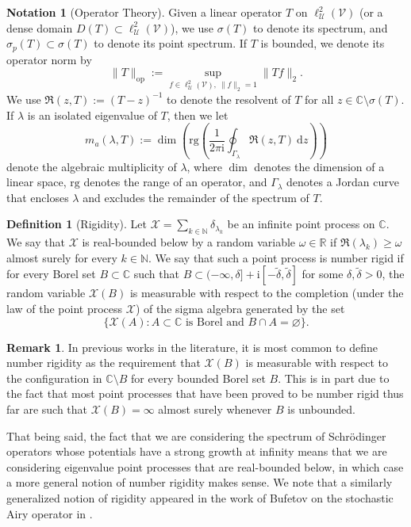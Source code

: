 \documentclass{amsart}
\numberwithin{equation}{section}
\theoremstyle{definition}
\newtheorem{definition}[theorem]{Definition}
\newtheorem{notation}[theorem]{Notation}
\newtheorem{remark}[theorem]{Remark}
\newcommand\de{\delta}
\newcommand\Ga{\Gamma}
\newcommand\la{\lambda}
\newcommand\om{\omega}
\newcommand\si{\sigma}
\renewcommand\d{~\mathrm d}
\newcommand\mbb{\mathbb}
\newcommand\mc{\mathcal}
\newcommand\mf{\mathfrak}
\newcommand\mr{\mathrm}
\newcommand\ms{\mathscr}
\begin{document}
\begin{notation}[Operator Theory]\label{def:Multiplicities}
Given a linear operator $T$ on $\ell^2_\ms U(\ms V)$ (or a dense domain $D(T)\subset\ell^2_\ms U(\ms V)$), we use $\si(T)$ to denote its spectrum,
and $\si_p(T)\subset\si(T)$ to denote its point spectrum. If $T$ is bounded, we denote its operator norm by
\[\|T\|_{\mr{op}}:=\sup_{f\in\ell^2_\ms U(\ms V),~\|f\|_{2}=1}\|Tf\|_{2}.\]
We use $\mf R(z,T):=(T-z)^{-1}$
to denote the resolvent of $T$ for all $z\in\mbb C\setminus\si(T)$.
If $\la$ is an isolated eigenvalue of $T$, then we let
\[m_a(\la,T):=\dim\left(\mr{rg}\left(\frac1{2\pi\mr i}\oint_{\Ga_\la}\mf R(z,T)\d z\right)\right)\]
denote the algebraic multiplicity of $\la$, where $\dim$ denotes the dimension of a linear space,
$\mr{rg}$ denotes the range of an operator, and
$\Ga_\la$ denotes a Jordan curve that encloses $\la$ and excludes the remainder
of the spectrum of $T$.
\end{notation}

%

\begin{definition}[Rigidity]
\label{Definition: Rigidity}
Let $\mc X=\sum_{k\in\mbb N}\de_{\la_k}$ be an infinite point process on $\mbb C$.
We say that $\mc X$ is real-bounded below by a random variable $\om\in\mbb R$
if $\Re(\la_k)\geq\om$ almost surely for every $k\in\mbb N$.
We say that such a point process is number rigid if for every Borel set $B\subset\mbb C$
such that $B\subset(-\infty,\de]+\mr i[-\tilde \de,\tilde \de]$
for some $\de,\tilde\de>0$, the random variable $\mc X(B)$ is measurable with
respect to the completion (under the law of the point process $\mc X$) of the sigma algebra generated by the set
\[\big\{\mc X(A):A\subset\mbb C\text{ is Borel and }B\cap A=\varnothing\big\}.\]
\end{definition}

%

\begin{remark}
In previous works in the literature, it is most common to define number rigidity
as the requirement that $\mc X(B)$ is measurable with respect to the configuration in $\mbb C\setminus B$
for every bounded Borel set $B$. This is in part due to the fact that most point processes
that have been proved to be number rigid thus far are such that $\mc X(B)=\infty$ almost surely
whenever $B$ is unbounded.

That being said, the fact that we are considering the spectrum of Schr\"odinger
operators whose potentials have a strong growth at infinity means that we are considering
eigenvalue point processes that are real-bounded below, in which case a more general
notion of number rigidity makes sense. We note that a similarly generalized notion of rigidity appeared
in the work of Bufetov on the stochastic Airy operator in \cite[Proposition 3.2]{Buf16}.
\end{remark}
\end{document}
